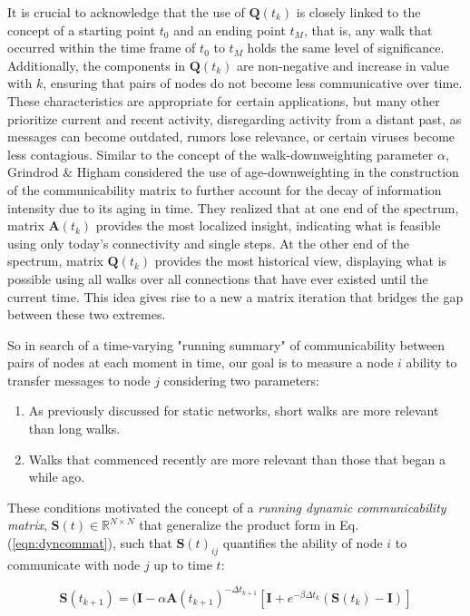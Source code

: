 It is crucial to acknowledge that the use of $\mathbf{Q}(t_k)$ is closely linked to the concept of a starting point $t_0$ and an ending point $t_M$, that is, any walk that occurred within the time frame of $t_0$ to $t_M$ holds the same level of significance. Additionally, the components in $\mathbf{Q}(t_k)$ are non-negative and increase in value with $k$, ensuring that pairs of nodes do not become less communicative over time. These characteristics are appropriate for certain applications, but many other prioritize current and recent activity, disregarding activity from a distant past, as messages can become outdated, rumors lose relevance, or certain viruses become less contagious. Similar to the concept of the walk-downweighting parameter $\alpha$, Grindrod \& Higham \cite{grindrod2013matrix} considered the use of age-downweighting in the construction of the communicability matrix to further account for the decay of information intensity due to its
aging in time. They realized that at one end of the spectrum, matrix $\mathbf{A}(t_k)$ provides the most localized insight, indicating what is feasible using only today's connectivity and single steps. At the other end of the spectrum, matrix $\mathbf{Q}(t_k)$ provides the most historical view, displaying what is possible using all walks over all connections that have ever existed until the current time. This idea gives rise to a new a matrix iteration that bridges the gap between these two extremes.

So in search of a time-varying "running summary" of communicability between pairs of nodes at each moment in time, our goal is to measure a node $i$ ability to transfer messages to node $j$ considering two parameters: 
\begin{enumerate}[label=(\roman*)]
  \item As previously discussed for static networks, short walks are more relevant than long walks.
  \item Walks that commenced recently are more relevant than those that began a while ago.
\end{enumerate}

 These conditions motivated the concept of a \textit{running dynamic communicability matrix}, $\mathbf{S}(t)\in\mathbb{R}^{N\times N}$ that generalize the product form in Eq. (\ref{eqn:dyncommat}), such that $\mathbf{S}(t)_{ij}$ quantifies the ability of node $i$ to communicate with node $j$ up to time $t$:
 
\begin{equation}
\label{eqn:rundyncommatdis}
    \mathbf{S}(t_{k+1}) = (\mathbf{I} -  \alpha \mathbf{A}(t_{k+1})^{-\Delta t_{k+1}}\left[\mathbf{I} + e^{-\beta\Delta t_k} (\mathbf{S}(t_k) - \mathbf{I})\right]
\end{equation} 

